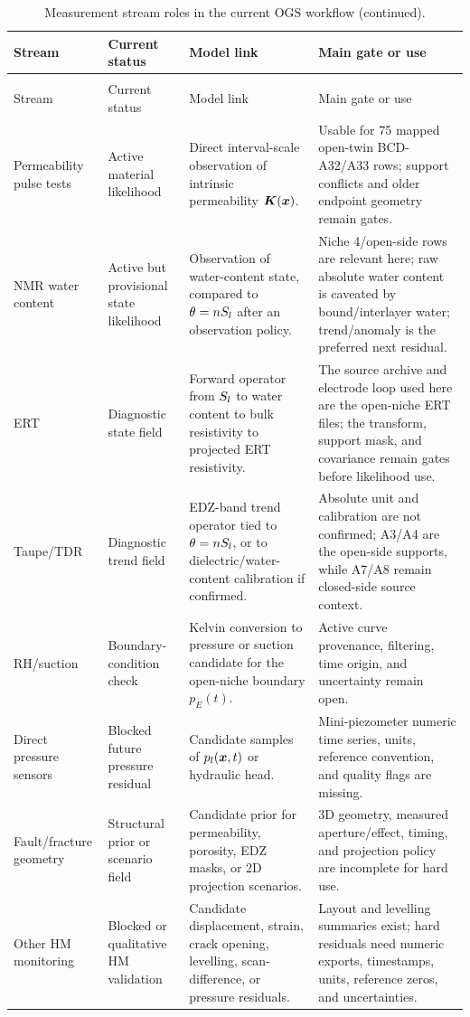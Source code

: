 \begin{longtable}{@{}L{0.19\textwidth} L{0.19\textwidth} L{0.23\textwidth} L{0.30\textwidth}@{}}
\caption{Measurement stream roles in the current OGS workflow.}
\label{tab:measurement-role-summary}\\
\toprule
Stream & Current status & Model link & Main gate or use\\
\midrule
\endfirsthead
\caption[]{Measurement stream roles in the current OGS workflow (continued).}\\
\toprule
Stream & Current status & Model link & Main gate or use\\
\midrule
\endhead
\bottomrule
\endlastfoot
Permeability pulse tests &
Active material likelihood &
Direct interval-scale observation of intrinsic permeability \(\bm{K}(\bm{x})\). &
Usable for 75 mapped open-twin BCD-A32/A33 rows; support conflicts and older
endpoint geometry remain gates.\\
NMR water content &
Active but provisional state likelihood &
Observation of water-content state, compared to \(\theta=nS_l\) after an
observation policy. &
Niche 4/open-side rows are relevant here; raw absolute water content is caveated by
bound/interlayer water; trend/anomaly is the preferred next residual.\\
ERT &
Diagnostic state field &
Forward operator from \(S_l\) to water content to bulk resistivity to projected ERT
resistivity. &
The source archive and electrode loop used here are the open-niche ERT files; the
transform, support mask, and covariance remain gates before likelihood use.\\
Taupe/TDR &
Diagnostic trend field &
EDZ-band trend operator tied to \(\theta=nS_l\), or to dielectric/water-content
calibration if confirmed. &
Absolute unit and calibration are not confirmed; A3/A4 are the open-side supports,
while A7/A8 remain closed-side source context.\\
RH/suction &
Boundary-condition check &
Kelvin conversion to pressure or suction candidate for the open-niche boundary
\(p_E(t)\). &
Active curve provenance, filtering, time origin, and uncertainty remain open.\\
Direct pressure sensors &
Blocked future pressure residual &
Candidate samples of \(p_l(\bm{x},t)\) or hydraulic head. &
Mini-piezometer numeric time series, units, reference convention, and quality flags
are missing.\\
Fault/fracture geometry &
Structural prior or scenario field &
Candidate prior for permeability, porosity, EDZ masks, or 2D projection scenarios. &
3D geometry, measured aperture/effect, timing, and projection policy are incomplete
for hard use.\\
Other HM monitoring &
Blocked or qualitative HM validation &
Candidate displacement, strain, crack opening, levelling, scan-difference, or
pressure residuals. &
Layout and levelling summaries exist; hard residuals need numeric exports,
timestamps, units, reference zeros, and uncertainties.\\
\end{longtable}

